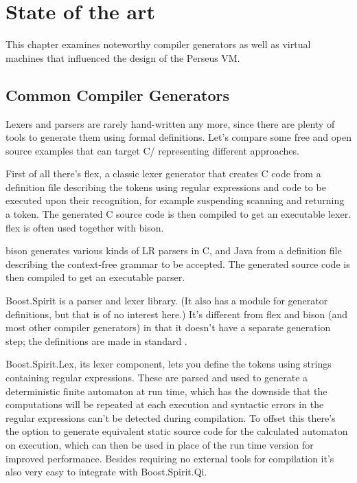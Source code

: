 
\chapter{State of the art}
	
	
	This chapter examines noteworthy compiler generators as well as virtual machines
	that influenced the design of the Perseus
	VM.
	
	\section{Common Compiler Generators}
    	
		Lexers and parsers are rarely hand-written any more, since there are plenty of tools to generate them using formal definitions. Let's compare some free and open source examples that can target C/{\CC} representing different approaches.
		
		First of all there's flex\cite{flex}, a classic lexer generator that creates C code from a definition file describing the tokens using regular expressions and code to be executed upon their recognition, for example suspending scanning and returning a token. The generated C source code is then compiled to get an executable lexer. flex is often used together with bison.
		
		bison\cite{bison} generates various kinds of LR parsers in C, {\CC} and Java from a definition file describing the context-free grammar to be accepted. The generated source code is then compiled to get an executable parser.
		
		Boost.Spirit\cite{spirit} is a {\CC} parser and lexer library. (It also has a module for generator definitions, but that is of no interest here.) It's different from flex and bison (and most other compiler generators) in that it doesn't have a separate generation step; the definitions are made in standard {\CC}.
		
		Boost.Spirit.Lex, its lexer component, lets you define the tokens using strings containing regular expressions. These are parsed and used to generate a deterministic finite automaton at run time, which has the downside that the computations will be repeated at each execution and syntactic errors in the regular expressions can't be detected during compilation. To offset this there's the option to generate equivalent static {\CC} source code for the calculated automaton on execution, which can then be used in place of the run time version for improved performance. Besides requiring no external tools for compilation it's also very easy to integrate with Boost.Spirit.Qi.
		
